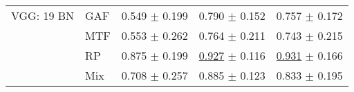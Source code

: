 \begin{tabular}[t]{lllll}
VGG: 19 BN & GAF & \textcolor[rgb]{0.8358563372,0.1641436628,0}{0.549} $\pm$ \textcolor[rgb]{0.7618477893,0.2381522107,0}{0.199} & \textcolor[rgb]{0.8699186992,0.1300813008,0}{0.790} $\pm$ \textcolor[rgb]{0.6304392736,0.3695607264,0}{0.152} & \textcolor[rgb]{0.7948717949,0.2051282051,0}{0.757} $\pm$ \textcolor[rgb]{0.4708846452,0.5000000000,0}{0.172} \\
 & MTF & \textcolor[rgb]{0.8254674978,0.1745325022,0}{0.553} $\pm$ \textcolor[rgb]{1.0000000000,0.0000000000,0}{0.262} & \textcolor[rgb]{1.0000000000,0.0000000000,0}{0.764} $\pm$ \textcolor[rgb]{1.0000000000,0.0000000000,0}{0.211} & \textcolor[rgb]{0.8461538462,0.1538461538,0}{0.743} $\pm$ \textcolor[rgb]{0.7343347100,0.2656652900,0}{0.215} \\
 & RP & \textcolor[rgb]{0.0685663402,0.5000000000,0}{0.875} $\pm$ \textcolor[rgb]{0.7623521573,0.2376478427,0}{0.199} & \underline{\textcolor[rgb]{0.1666666667,0.5000000000,0}{0.927}} $\pm$ \textcolor[rgb]{0.4030274280,0.5000000000,0}{0.116} & \underline{\textcolor[rgb]{0.1538461538,0.5000000000,0}{0.931}} $\pm$ \textcolor[rgb]{0.4332280526,0.5000000000,0}{0.166} \\
 & Mix & \textcolor[rgb]{0.4603739982,0.5000000000,0}{0.708} $\pm$ \textcolor[rgb]{0.9841924031,0.0158075969,0}{0.257} & \textcolor[rgb]{0.3821138211,0.5000000000,0}{0.885} $\pm$ \textcolor[rgb]{0.4457804883,0.5000000000,0}{0.123} & \textcolor[rgb]{0.5128205128,0.4871794872,0}{0.833} $\pm$ \textcolor[rgb]{0.6106582296,0.3893417704,0}{0.195} \\
\bottomrule
\end{tabular}

